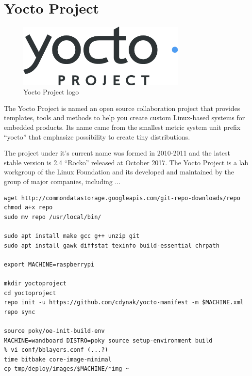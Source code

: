\documentclass[printmode]{mgr}
\begin{document}
\section{Yocto Project}

\begin{figure}[htbp]
  \centering
    \includegraphics[width=0.75\textwidth]{yoctoproject-logo.png}
    \caption{Yocto Project logo}
  \label{fig:yoctoproject-logo}
\end{figure}

The Yocto Project is named an open source collaboration project that provides templates, tools and methods to help you create custom Linux-based systems for embedded products. Its name came from the smallest metric system unit prefix ``yocto'' that emphasize possibility to create tiny distributions.

The project under it's current name was formed in 2010-2011 and the latest stable version is 2.4 ``Rocko'' released at October 2017. The Yocto Project is a lab workgroup of the Linux Foundation and its developed and maintained by the group of major companies, including ...







\begin{lstlisting}
wget http://commondatastorage.googleapis.com/git-repo-downloads/repo
chmod a+x repo
sudo mv repo /usr/local/bin/

sudo apt install make gcc g++ unzip git
sudo apt install gawk diffstat texinfo build-essential chrpath

export MACHINE=raspberrypi

mkdir yoctoproject
cd yoctoproject
repo init -u https://github.com/cdynak/yocto-manifest -m $MACHINE.xml
repo sync

source poky/oe-init-build-env
MACHINE=wandboard DISTRO=poky source setup-environment build
% vi conf/bblayers.conf (...?)
time bitbake core-image-minimal
cp tmp/deploy/images/$MACHINE/*img ~
\end{lstlisting}
\end{document}
